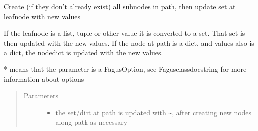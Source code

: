 \documentclass[a4paper,10pt,english]{sphinxmanual}
\begin{document}
\begin{fulllineitems}
\begin{fulllineitems}
\label{\detokenize{fagus:fagus.Fagus.update}}
\pysigstartsignatures
{}
\pysigstopsignatures
\sphinxAtStartPar
Create (if they don’t already exist) all sub\sphinxhyphen{}nodes in path, then update set at leaf\sphinxhyphen{}node with new values

\sphinxAtStartPar
If the leaf\sphinxhyphen{}node is a list, tuple or other value it is converted to a set. That set is then updated with the new
values. If the node at path is a dict, and values also is a dict, the node\sphinxhyphen{}dict is updated with the new values.

\sphinxAtStartPar
* means that the parameter is a FagusOption, see Fagus\sphinxhyphen{}class\sphinxhyphen{}docstring for more information about options
\begin{quote}\begin{description}
\item[{Parameters}] \leavevmode\begin{itemize}
\item {}
\sphinxAtStartPar
{} \textendash{} the set/dict at path is updated with \textasciitilde{}, after creating new nodes along path as necessary


\end{itemize}
\end{description}
\end{quote}
\end{fulllineitems}
\end{fulllineitems}
\end{document}

